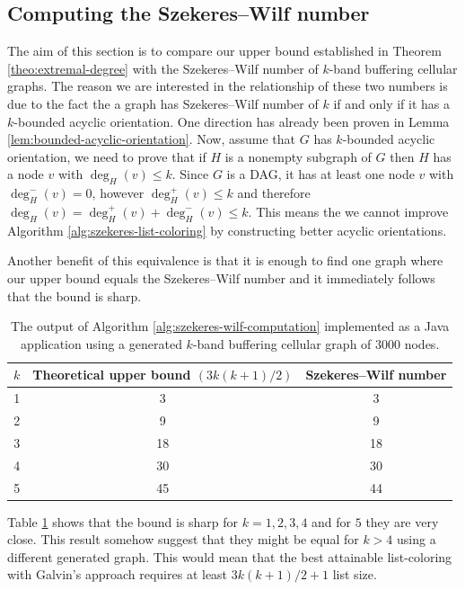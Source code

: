 \documentclass[a4paper, 12pt]{article}
\begin{document}
\subsection{Computing the Szekeres\---Wilf number}
The aim of this section is to compare our upper bound established in Theorem \ref{theo:extremal-degree} with the Szekeres\---Wilf number of $k$-band buffering cellular graphs. The reason we are interested in the relationship of these two numbers is due to the fact the a graph has Szekeres\---Wilf number of $k$ if and only if it has a $k$-bounded acyclic orientation. One direction has already been proven in Lemma \ref{lem:bounded-acyclic-orientation}. Now, assume that $G$ has $k$-bounded acyclic orientation, we need to prove that if $H$ is a nonempty subgraph of $G$ then $H$ has a node $v$ with $\deg_H(v) \leqslant k$. Since $G$ is a DAG, it has at least one node $v$ with $\deg_{H}^-(v)=0$, however $\deg_{H}^+(v) \leqslant k$ and therefore $\deg_H(v) = \deg_{H}^+(v) + \deg_{H}^-(v) \leqslant k$. This means the we cannot improve Algorithm \ref{alg:szekeres-list-coloring} by constructing better acyclic orientations.

Another benefit of this equivalence is that it is enough to find one graph where our upper bound equals the Szekeres\---Wilf number and it immediately follows that the bound is sharp.
\begin{table}[h!]
\centering
\begin{tabular}{|c|c|c|}
\hline
 $k$& Theoretical upper bound $(3k(k+1)/2)$ & Szekeres\---Wilf number \\ \hline
 1&  3&  3 \\ \hline
 2&  9&  9\\ \hline
 3&  18& 18\\ \hline
 4&  30& 30\\ \hline
 5&  45& 44 \\ \hline
\end{tabular}
\caption{The output of Algorithm \ref{alg:szekeres-wilf-computation} implemented as a Java application using a generated $k$-band buffering cellular graph of $3000$ nodes.}
\label{eval-szekeres}
\end{table}

Table \ref{eval-szekeres} shows that the bound is sharp for $k=1,2,3,4$ and for $5$ they are very close. This result somehow suggest that they might be equal for $k > 4$ using a different generated graph. This would mean that the best attainable list-coloring with Galvin's approach requires at least $3k(k+1)/2+1$ list size.
\end{document}
